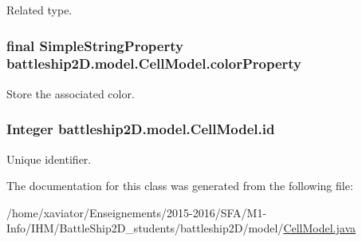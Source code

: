 Related type. 

\hypertarget{classbattleship2D_1_1model_1_1CellModel_a35a8bdca8ab2e2a3a3d393f8707638fc}{
\subsubsection[{color\-Property}]{\setlength{\rightskip}{0pt plus 5cm}final Simple\-String\-Property battleship2\-D.\-model.\-Cell\-Model.\-color\-Property\hspace{0.3cm}{\ttfamily [private]}}}\label{classbattleship2D_1_1model_1_1CellModel_a35a8bdca8ab2e2a3a3d393f8707638fc}


Store the associated color. 

\hypertarget{classbattleship2D_1_1model_1_1CellModel_a13643b1cd9553923ad542cf6c594d3c3}{
\subsubsection[{id}]{\setlength{\rightskip}{0pt plus 5cm}Integer battleship2\-D.\-model.\-Cell\-Model.\-id\hspace{0.3cm}{\ttfamily [private]}}}\label{classbattleship2D_1_1model_1_1CellModel_a13643b1cd9553923ad542cf6c594d3c3}


Unique identifier. 



The documentation for this class was generated from the following file\-:\begin{DoxyCompactItemize}
\item 
/home/xaviator/\-Enseignements/2015-\/2016/\-S\-F\-A/\-M1-\/\-Info/\-I\-H\-M/\-Battle\-Ship2\-D\-\_\-students/battleship2\-D/model/\hyperlink{CellModel_8java}{Cell\-Model.\-java}\end{DoxyCompactItemize}
